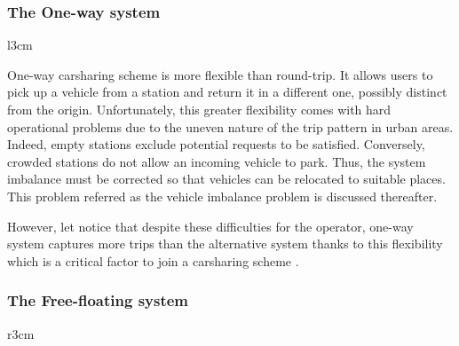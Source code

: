 \subsubsection{The One-way system}

\begin{wrapfigure}[6]{l}{3cm}
\vspace{-.4cm}
\centering
{}
\end{wrapfigure}

One-way carsharing scheme is more flexible than round-trip.
It allows users to pick up a vehicle from a station and return it in a different one, possibly distinct from the origin.
Unfortunately, this greater flexibility comes with hard operational problems due to the uneven nature of the trip pattern in urban areas.
Indeed, empty stations exclude potential requests to be satisfied.
Conversely, crowded stations do not allow an incoming vehicle to park.
Thus, the system imbalance must be corrected so that vehicles can be relocated to suitable places.
This problem referred as the vehicle imbalance problem is discussed thereafter.

However, let notice that despite these difficulties for the operator, one-way system captures more trips than the alternative system thanks to this flexibility which is a critical factor to join a carsharing scheme \cite{efthymiou_which_2012}.


\subsubsection{The Free-floating system}

\begin{wrapfigure}[6]{r}{3cm}
\vspace{-.4cm}
\centering
{}
\end{wrapfigure}

